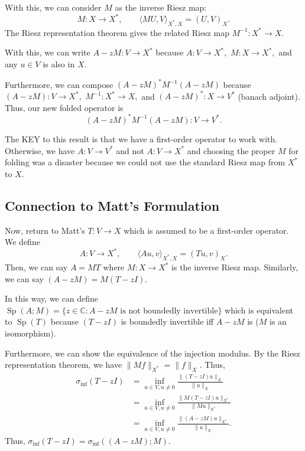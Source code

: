 \documentclass[12pt,a4paper]{article}
\begin{document}
With this, we can consider $M$ as the inverse Riesz map:
\begin{equation}
    M: X \rightarrow X^*,\qquad \langle MU, V\rangle_{X^*, X} = (U, V)_X.
\end{equation}
The Riesz representation theorem gives the related Riesz map $M^{-1}: X^* \rightarrow X.$ 

With this, we can write $A-zM: V \rightarrow X^*$ because $A : V \rightarrow X^*,$ $M: X \rightarrow X^*,$ and any $u \in V$ is also in $X.$

Furthermore, we can compose $(A-zM)^* M^{-1} (A-zM)$ because $(A-zM): V \rightarrow X^*,$ $M^{-1}: X^* \rightarrow X,$ and $(A-zM)^* : X \rightarrow V^*$ (banach adjoint). Thus, our new folded operator is 
\begin{equation}
    (A-zM)^* M^{-1} (A-zM) : V \rightarrow V^*.
\end{equation}

The KEY to this result is that we have a first-order operator to work with. Otherwise, we have $A: V \rightarrow V^*$ and not $A: V \rightarrow X^*$ and choosing the proper $M$ for folding was a disaster because we could not use the standard Riesz map from $X^*$ to $X.$ 


\subsection{Connection to Matt's Formulation}

Now, return to Matt's $T: V \rightarrow X$ which is assumed to be a first-order operator. We define 
\begin{equation}
    A : V \rightarrow X^*, \qquad \langle Au, v \rangle_{X^*, X} = (Tu, v)_{X}.
\end{equation}
Then, we can say $A = MT$ where $M:X \rightarrow X^*$ is the inverse Riesz map. Similarly, we can say $(A-zM) = M(T-zI).$

In this way, we can define $\operatorname{Sp}(A; M) =\{z \in \mathbb{C} : A-zM \text{ is not boundedly invertible} \}$ which is equivalent to $\operatorname{Sp}(T)$ because $(T-zI)$ is boundedly invertible iff $A-zM$ is ($M$ is an isomorphism). 

Furthermore, we can show the equivalence of the injection modulus. By the Riesz representation theorem, we have 
$ \| Mf \|_{X^*} = \|f \|_{X}.$ Thus, 
\begin{align}
    \sigma_{\inf}(T-zI) &= \inf_{u \in V, u \ne 0} \frac{\|(T-zI) u \|_{X}}{\|u\|_X} \\\
    &= \inf_{u \in V, u \ne 0} \frac{\|M (T-zI) u \|_{X^*}}{\|Mu\|_{X^*}} \\
    &= \inf_{u \in V, u \ne 0} \frac{\|(A-zM) u \|_{X^*}}{\|u\|_X}.
\end{align}
Thus, $\sigma_{\inf}(T-zI) = \sigma_{\inf}((A-zM); M).$
\end{document}
